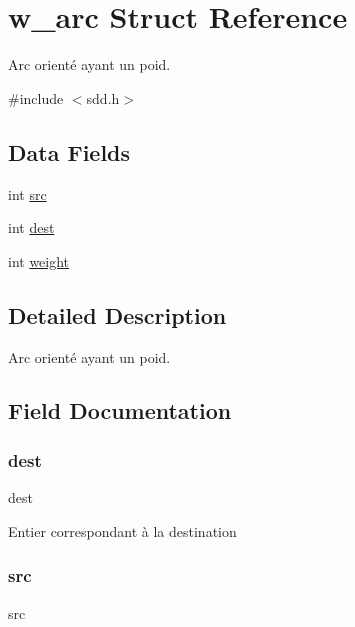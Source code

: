 \hypertarget{structw__arc}{}\section{w\+\_\+arc Struct Reference}
\label{structw__arc}


Arc orienté ayant un poid.  




{\ttfamily \#include $<$sdd.\+h$>$}

\subsection*{Data Fields}
\begin{DoxyCompactItemize}
\item 
int \hyperlink{structw__arc_a0e9117de7e6a340559202f88a1dbd9c6}{src}
\item 
int \hyperlink{structw__arc_ab0bede79c5f4cbed9c2cd932a0ace201}{dest}
\item 
int \hyperlink{structw__arc_a103012df4b715f58a539b009a0b8b340}{weight}
\end{DoxyCompactItemize}


\subsection{Detailed Description}
Arc orienté ayant un poid. 

\subsection{Field Documentation}
\mbox{\label{structw__arc_ab0bede79c5f4cbed9c2cd932a0ace201}} 
\subsubsection{\texorpdfstring{dest}{dest}}
{\footnotesize\ttfamily dest}

Entier correspondant à la destination \mbox{\label{structw__arc_a0e9117de7e6a340559202f88a1dbd9c6}} 
\subsubsection{\texorpdfstring{src}{src}}
{\footnotesize\ttfamily src}

